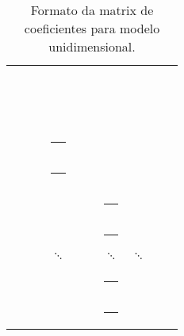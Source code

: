 \documentclass[final,5p]{elsarticle}
\numberwithin{equation}{section}
\newcommand*{\squareb}{\textcolor{black}{\rule{0.5em}{0.5em}}}
\newcommand*{\squareg}{\textcolor{gray}{\rule{0.5em}{0.5em}}}
\begin{document}
        \begin{table}
            \centering
            \caption{Formato da matrix de coeficientes para modelo unidimensional.}
            \label{tab:unidimensional}
            \bigskip
            \renewcommand{\arraystretch}{0.8}
            \begin{tabularx}{0.35\textwidth}{|XXXXXXXXXX|}
                \squareb & \squareb & \squareg &          &          &          &           &          &          &          \\
                \squareb & \squareb & \squareg &          &          &          &           &          &          &          \\
                \squareg &           & \squareb & \squareb & \squareg &          &           &          &          &          \\
                \squareg &           & \squareb & \squareb & \squareg &          &           &          &          &          \\
                         &           & \squareg &          & \squareb & \squareb & \squareg  &          &          &          \\
                         &           & \squareg &          & \squareb & \squareb & \squareg  &          &          &          \\
                         &           &          & $\ddots$ &          &          & $\ddots$  & $\ddots$ &          &          \\
                         &           &          &          &          &          &           &          &          &          \\
                         &           &          &          &          &          & \squareg  &          & \squareb & \squareb \\
                         &           &          &          &          &          & \squareg  &          & \squareb & \squareb \\
            \end{tabularx}
        \end{table}
\end{document}
